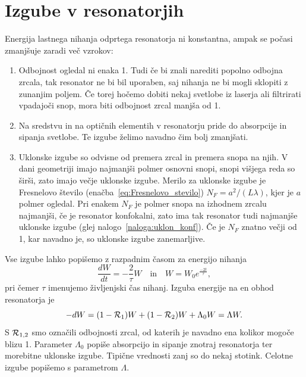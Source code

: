 \section{Izgube v resonatorjih}
Energija lastnega nihanja odprtega resonatorja ni konstantna, ampak se počasi
zmanjšuje zaradi več vzrokov:\\
\begin{enumerate}
\item Odbojnost ogledal ni enaka 1. Tudi če bi znali narediti popolno odbojna zrcala, 
tak resonator ne bi bil uporaben, saj nihanja ne bi mogli sklopiti z zunanjim poljem. Če 
torej hočemo dobiti nekaj svetlobe iz laserja ali filtrirati vpadajoči
snop, mora biti odbojnost zrcal manjša od 1.\\
\item Na sredstvu in na optičnih elementih v resonatorju pride do absorpcije in
sipanja svetlobe. Te izgube želimo navadno čim bolj zmanjšati.\\
\item Uklonske izgube so odvisne od premera zrcal in premera snopa na njih.
V dani geometriji imajo najmanjši polmer osnovni snopi, snopi višjega
reda so širši, zato imajo večje uklonske izgube. Merilo za uklonske
izgube je Fresnelovo število (enačba~\ref{eq:Fresnelovo_stevilo}) 
$N_{F}=a^{2}/(L\lambda)$, kjer je $a$ polmer ogledal. Pri enakem $N_{F}$ je
polmer snopa na izhodnem zrcalu najmanjši, če je resonator konfokalni, 
zato ima tak resonator tudi najmanjše uklonske izgube (glej nalogo~\ref{naloga:uklon_konf}).
Če je $N_{F}$ znatno večji od 1, kar navadno je, so uklonske izgube zanemarljive. \\
\end{enumerate}

Vse izgube lahko popišemo z razpadnim časom za energijo nihanja 
\begin{equation}
\frac{dW}{dt}=-\frac{2}{\tau}W \quad \textrm{in} \quad W = W_0 e^{\frac{-2t}{\tau}},
\label{eq:dW}
\end{equation}
pri čemer $\tau$ imenujemo življenjski čas nihanj.
Izguba energije na en obhod resonatorja je
\begin{equation}
-dW = (1-{\cal R}_{1})W+(1-{\cal R}_{2})W +\Lambda_{0} W = \Lambda W.
\label{eq:Lambda}
\end{equation}
S ${\cal R}_{1,2}$ smo označili odbojnosti zrcal, od katerih je navadno ena
kolikor mogoče blizu 1. Parameter $\Lambda_{0}$ popiše absorpcijo in
sipanje znotraj resonatorja ter morebitne uklonske izgube. Tipične vrednosti 
zanj so do nekaj stotink. Celotne izgube popišemo s parametrom $\Lambda$. 

